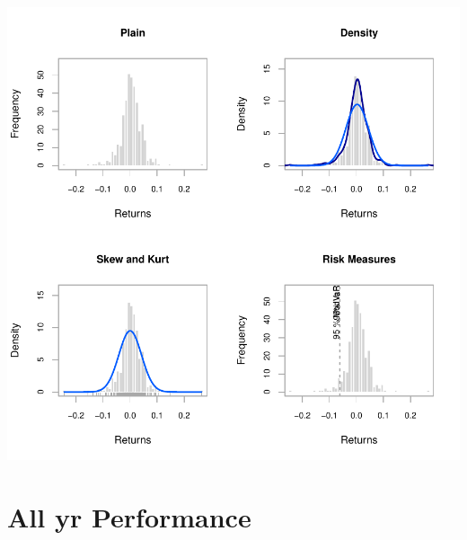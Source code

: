 \documentclass{article}
\begin{document}
\includegraphics{graphics/plot-003}

\section{All yr Performance}
\end{document}
